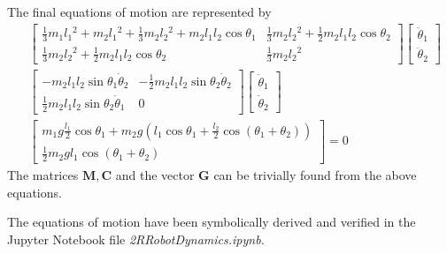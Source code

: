 The final equations of motion are represented by
\begin{align*}
	&\left[\begin{array}{lc}
		\frac{1}{3} m_1 l_1{ }^2+m_2 l_1{ }^2+\frac{1}{3} m_2 l_2{ }^2+m_2 l_1 l_2 \cos \theta_1 & \frac{1}{3} m_2 l_2{ }^2+\frac{1}{2} m_2 l_1 l_2 \cos \theta_2 \\
		\frac{1}{3} m_2 l_2{ }^2+\frac{1}{2} m_2 l_1 l_2 \cos \theta_2 & \frac{1}{3} m_2 l_2{ }^2
	\end{array}\right]\begin{bmatrix}
	\ddot{\theta}_1\\
	\ddot{\theta}_2
\end{bmatrix} \\
& \left[\begin{array}{cc}
	-m_2 l_1 l_2 \sin \theta_1 \dot{\theta}_2 & -\frac{1}{2} m_2 l_1 l_2 \sin \theta_2 \dot{\theta}_2 \\
	\frac{1}{2} m_2 l_1 l_2 \sin \theta_2 \dot{\theta}_1 & 0
\end{array}\right]\begin{bmatrix}
\dot{\theta}_1\\
\dot{\theta}_2
\end{bmatrix} \\ 
& \begin{bmatrix}
	m_1g\frac{l_1}{2}\cos\theta_1 + m_2g\left(l_1\cos\theta_1 + \frac{l_2}{2}\cos\left(\theta_1 + \theta_2\right)\right)\\
	\frac{1}{2}m_2gl_1\cos\left(\theta_1 + \theta_2\right)
\end{bmatrix} = 0
\end{align*}
The matrices $\bm{M}, \bm{C}$ and the vector $\bm{G}$ can be trivially found from the above equations.

The equations of motion have been symbolically derived and verified in the Jupyter Notebook file \emph{2RRobotDynamics.ipynb}.


